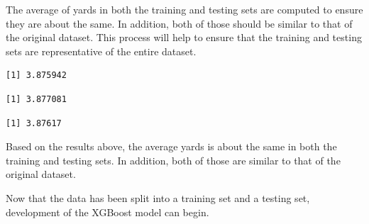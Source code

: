 \documentclass[
  super,
  preprint,
  3p]{elsarticle}
\newenvironment{Shaded}{\begin{snugshade}}{\end{snugshade}}
\newcommand{\CommentTok}[1]{\textcolor[rgb]{0.37,0.37,0.37}{#1}}
\newcommand{\FunctionTok}[1]{\textcolor[rgb]{0.28,0.35,0.67}{#1}}
\newcommand{\NormalTok}[1]{\textcolor[rgb]{0.00,0.23,0.31}{#1}}
\newcommand{\OtherTok}[1]{\textcolor[rgb]{0.00,0.23,0.31}{#1}}
\newcommand{\SpecialCharTok}[1]{\textcolor[rgb]{0.37,0.37,0.37}{#1}}
\begin{document}
The average of yards in both the training and testing sets are computed
to ensure they are about the same. In addition, both of those should be
similar to that of the original dataset. This process will help to
ensure that the training and testing sets are representative of the
entire dataset.

\begin{Shaded}
\end{Shaded}

\begin{verbatim}
[1] 3.875942
\end{verbatim}

\begin{Shaded}
\end{Shaded}

\begin{verbatim}
[1] 3.877081
\end{verbatim}

\begin{Shaded}
\end{Shaded}

\begin{verbatim}
[1] 3.87617
\end{verbatim}

Based on the results above, the average yards is about the same in both
the training and testing sets. In addition, both of those are similar to
that of the original dataset.

Now that the data has been split into a training set and a testing set,
development of the XGBoost model can begin.
\end{document}
